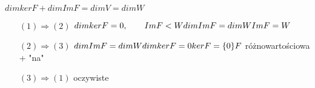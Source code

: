 \begin{dd} 
    ~\\
    $dimker F + dimIm F = dim V = dim W$
    \begin{itemize}
        \item[$(1) \Rightarrow (2)$] $
            dimker F = 0, \qquad Im F < W \\
            dimIm F = dim W \\ 
            Im F = W$
        \item[$(2) \Rightarrow (3)$]
            $
            dimImF = dimW \\
            dimkerF = 0 \\ 
            kerF = \{0\} \\
            F
            $ różnowartościowa + "na"
        \item[$(3) \Rightarrow (1)$] oczywiste
    \end{itemize} 
\end{dd}
